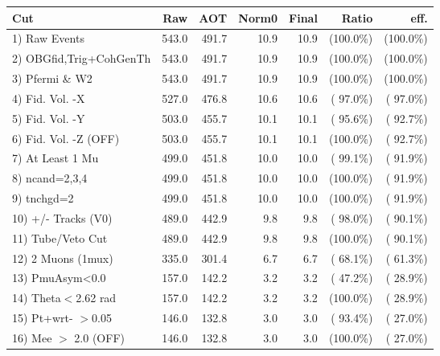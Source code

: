  \begin{table}[h!]\centering
 \begin{tabular}{||l||r|r|r|r|r|r||}
 \hline
 \hline
 Cut & Raw & AOT & Norm0 & Final & Ratio & eff.       \\
 \hline
  1) Raw Events           &        543.0 &        491.7 &         10.9 &         10.9 & (100.0\%) & (100.0\%) \\
  2) OBGfid,Trig+CohGenTh &        543.0 &        491.7 &         10.9 &         10.9 & (100.0\%) & (100.0\%) \\
  3) Pfermi \& W2         &        543.0 &        491.7 &         10.9 &         10.9 & (100.0\%) & (100.0\%) \\
  4) Fid. Vol. -X         &        527.0 &        476.8 &         10.6 &         10.6 & ( 97.0\%) & ( 97.0\%) \\
  5) Fid. Vol. -Y         &        503.0 &        455.7 &         10.1 &         10.1 & ( 95.6\%) & ( 92.7\%) \\
  6) Fid. Vol. -Z (OFF)   &        503.0 &        455.7 &         10.1 &         10.1 & (100.0\%) & ( 92.7\%) \\
  7) At Least 1 Mu        &        499.0 &        451.8 &         10.0 &         10.0 & ( 99.1\%) & ( 91.9\%) \\
  8) ncand=2,3,4          &        499.0 &        451.8 &         10.0 &         10.0 & (100.0\%) & ( 91.9\%) \\
  9) tnchgd=2             &        499.0 &        451.8 &         10.0 &         10.0 & (100.0\%) & ( 91.9\%) \\
 10) +/- Tracks (V0)      &        489.0 &        442.9 &          9.8 &          9.8 & ( 98.0\%) & ( 90.1\%) \\
 11) Tube/Veto Cut        &        489.0 &        442.9 &          9.8 &          9.8 & (100.0\%) & ( 90.1\%) \\
 12) 2 Muons (1mux)       &        335.0 &        301.4 &          6.7 &          6.7 & ( 68.1\%) & ( 61.3\%) \\
 13) PmuAsym<0.0          &        157.0 &        142.2 &          3.2 &          3.2 & ( 47.2\%) & ( 28.9\%) \\
 14) Theta$<$2.62 rad     &        157.0 &        142.2 &          3.2 &          3.2 & (100.0\%) & ( 28.9\%) \\
 15) Pt+wrt- $>$0.05      &        146.0 &        132.8 &          3.0 &          3.0 & ( 93.4\%) & ( 27.0\%) \\
 16) Mee $>$ 2.0  (OFF)   &        146.0 &        132.8 &          3.0 &          3.0 & (100.0\%) & ( 27.0\%) \\

\end{tabular}
\end{table}
